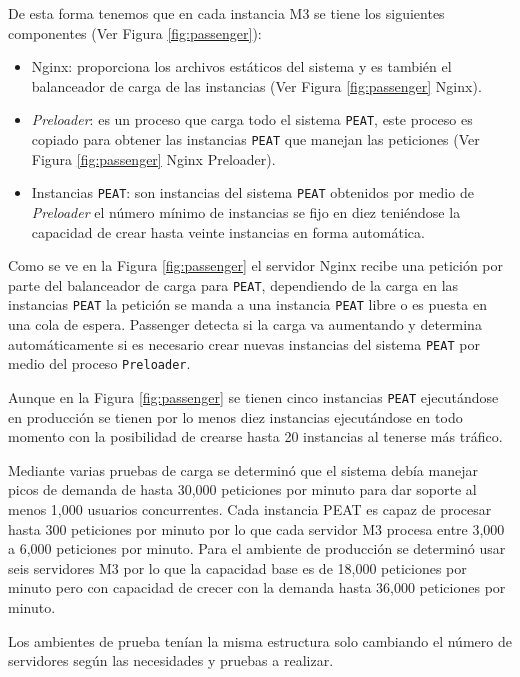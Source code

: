 De esta forma tenemos que en cada instancia M3 se tiene los
siguientes componentes (Ver Figura \ref{fig:passenger}):
\begin{itemize}
\item Nginx: proporciona los archivos estáticos del sistema y es también el
  balanceador de carga de las instancias (Ver Figura \ref{fig:passenger} Nginx).
\item \textit{Preloader}: es un proceso que carga todo el sistema \texttt{PEAT},
  este proceso es copiado para obtener las instancias \texttt{PEAT} que manejan las
  peticiones (Ver Figura \ref{fig:passenger} Nginx Preloader).
\item Instancias \texttt{PEAT}: son instancias del sistema \texttt{PEAT} obtenidos
  por medio de \textit{Preloader} el número mínimo de instancias se fijo en diez
  teniéndose la capacidad de crear hasta veinte instancias en forma automática.
\end{itemize}


Como se ve en la Figura \ref{fig:passenger} el servidor Nginx recibe una petición
por parte del balanceador de carga para \texttt{PEAT}, dependiendo de la carga
en las instancias \texttt{PEAT} la petición se manda a una instancia \texttt{PEAT}
libre o es puesta en una cola de espera. Passenger detecta si la carga va aumentando
y determina automáticamente si es necesario crear nuevas instancias del sistema
\texttt{PEAT} por medio del proceso \texttt{Preloader}.

Aunque en la Figura \ref{fig:passenger} se tienen cinco instancias \texttt{PEAT}
ejecutándose en producción se tienen por lo menos diez instancias ejecutándose en
todo momento con la posibilidad de crearse hasta 20 instancias al tenerse más
tráfico.

Mediante varias pruebas de carga se determinó que el sistema debía manejar picos
de demanda de hasta 30,000 peticiones por minuto para dar soporte al menos
1,000 usuarios concurrentes. Cada instancia PEAT es capaz de procesar hasta
300 peticiones por minuto por lo que cada servidor M3 procesa entre
3,000 a 6,000 peticiones por minuto. Para el ambiente de producción se determinó
usar seis servidores M3 por lo que la capacidad base es de 18,000
peticiones por minuto pero con capacidad de crecer con la demanda hasta
36,000 peticiones por minuto.

Los ambientes de prueba tenían la misma estructura solo cambiando el número
de servidores según las necesidades y pruebas a realizar.

